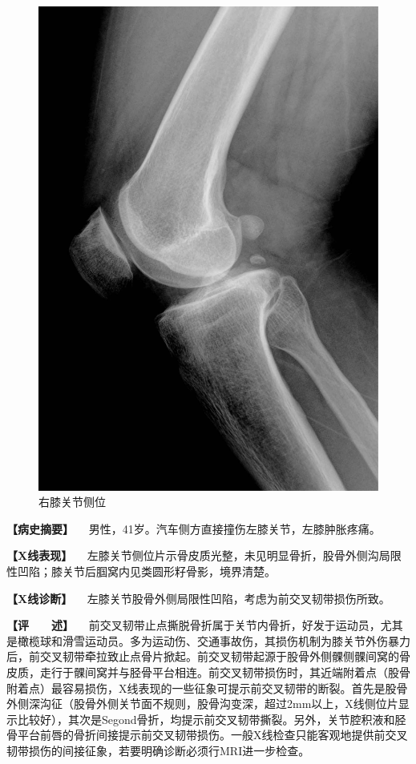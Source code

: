 \begin{figure}[!htbp]
 \centering
 \includegraphics{./images/Image00049.jpg}
 \captionsetup{justification=centering}
 \caption{右膝关节侧位}
 \label{fig2-3-22}
  \end{figure} 

\textbf{【病史摘要】}
　男性，41岁。汽车侧方直接撞伤左膝关节，左膝肿胀疼痛。

\textbf{【X线表现】}
　左膝关节侧位片示骨皮质光整，未见明显骨折，股骨外侧沟局限性凹陷；膝关节后腘窝内见类圆形籽骨影，境界清楚。

\textbf{【X线诊断】}
　左膝关节股骨外侧局限性凹陷，考虑为前交叉韧带损伤所致。

\textbf{【评　　述】}
　前交叉韧带止点撕脱骨折属于关节内骨折，好发于运动员，尤其是橄榄球和滑雪运动员。多为运动伤、交通事故伤，其损伤机制为膝关节外伤暴力后，前交叉韧带牵拉致止点骨片掀起。前交叉韧带起源于股骨外侧髁侧髁间窝的骨皮质，走行于髁间窝并与胫骨平台相连。前交叉韧带损伤时，其近端附着点（股骨附着点）最容易损伤，X线表现的一些征象可提示前交叉韧带的断裂。首先是股骨外侧深沟征（股骨外侧关节面不规则，股骨沟变深，超过2mm以上，X线侧位片显示比较好），其次是Segond骨折，均提示前交叉韧带撕裂。另外，关节腔积液和胫骨平台前唇的骨折间接提示前交叉韧带损伤。一般X线检查只能客观地提供前交叉韧带损伤的间接征象，若要明确诊断必须行MRI进一步检查。

